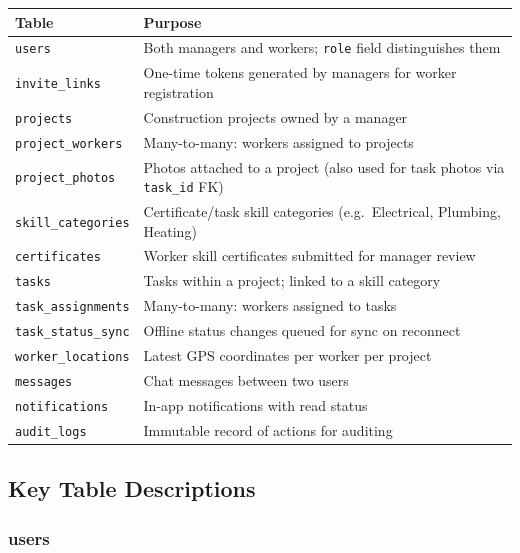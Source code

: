 \documentclass[12pt,a4paper]{article}
\begin{document}
\begin{tabular}{lp{}}
\toprule
\textbf{Table} & \textbf{Purpose} \\
\midrule
\texttt{users}              & Both managers and workers; \texttt{role} field distinguishes them \\
\texttt{invite\_links}      & One-time tokens generated by managers for worker registration \\
\texttt{projects}           & Construction projects owned by a manager \\
\texttt{project\_workers}   & Many-to-many: workers assigned to projects \\
\texttt{project\_photos}    & Photos attached to a project (also used for task photos via \texttt{task\_id} FK) \\
\texttt{skill\_categories}  & Certificate/task skill categories (e.g.\ Electrical, Plumbing, Heating) \\
\texttt{certificates}       & Worker skill certificates submitted for manager review \\
\texttt{tasks}              & Tasks within a project; linked to a skill category \\
\texttt{task\_assignments}  & Many-to-many: workers assigned to tasks \\
\texttt{task\_status\_sync} & Offline status changes queued for sync on reconnect \\
\texttt{worker\_locations}  & Latest GPS coordinates per worker per project \\
\texttt{messages}           & Chat messages between two users \\
\texttt{notifications}      & In-app notifications with read status \\
\texttt{audit\_logs}        & Immutable record of actions for auditing \\
\bottomrule
\end{tabular}

\subsection{Key Table Descriptions}

\subsubsection{users}
\end{document}

